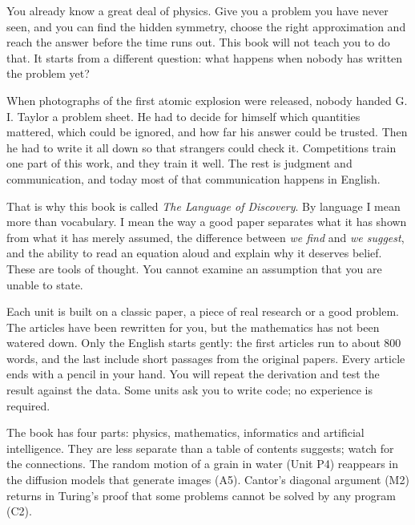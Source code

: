 \documentclass[11pt,a4paper]{article}
\begin{document}
\maintextlayout
\setcounter{lodpara}{0}


\pn You already know a great deal of physics. Give you a problem you have never seen, and you can find the hidden symmetry, choose the right approximation and reach the answer before the time runs out. This book will not teach you to do that. It starts from a different question: what happens when nobody has written the problem yet?

\pn When photographs of the first atomic explosion were released, nobody handed G. I. Taylor a problem sheet. He had to decide for himself which quantities mattered, which could be ignored, and how far his answer could be trusted. Then he had to write it all down so that strangers could check it. Competitions train one part of this work, and they train it well. The rest is judgment and communication, and today most of that communication happens in English.

\pn That is why this book is called \textit{The Language of Discovery}. By language I mean more than vocabulary. I mean the way a good paper separates what it has shown from what it has merely assumed, the difference between \textit{we find} and \textit{we suggest}, and the ability to read an equation aloud and explain why it deserves belief. These are tools of thought. You cannot examine an assumption that you are unable to state.

\pn Each unit is built on a classic paper, a piece of real research or a good problem. The articles have been rewritten for you, but the mathematics has not been watered down. Only the English starts gently: the first articles run to about 800 words, and the last include short passages from the original papers. Every article ends with a pencil in your hand. You will repeat the derivation and test the result against the data. Some units ask you to write code; no experience is required.

\pn The book has four parts: physics, mathematics, informatics and artificial intelligence. They are less separate than a table of contents suggests; watch for the connections. The random motion of a grain in water (Unit P4) reappears in the diffusion models that generate images (A5). Cantor's diagonal argument (M2) returns in Turing's proof that some problems cannot be solved by any program (C2).
\end{document}
